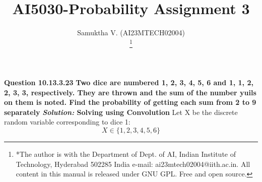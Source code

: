 \documentclass[journal,12pt,twocolumn]{IEEEtran}
\begin{document}
\vspace{3cm}

\title{
AI5030-Probability Assignment 3
}
\author{ Samuktha V. (AI23MTECH02004)

	\thanks{*The author is with the Department
		of Dept. of AI, Indian Institute of Technology, Hyderabad
		502285 India e-mail:  ai23mtech02004@iith.ac.in. All content in this manual is released under GNU GPL.  Free and open source.}
}

\maketitle

\newpage


\textbf{Question 10.13.3.23 }
\newline
\textbf{Two dice are numbered 1, 2, 3, 4, 5, 6 and 1, 1, 2, 2, 3, 3, respectively. They are
thrown and the sum of the number yuils on them is noted. Find the probability of getting
each sum from 2 to 9 separately }
\newline
\newline
\textbf{\emph{Solution:} Solving using Convolution}
\newline
\newline
{ Let X be the discrete random variable corresponding to dice 1: \[ X \in \{1,2,3,4,5,6\} \]}
\end{document}
